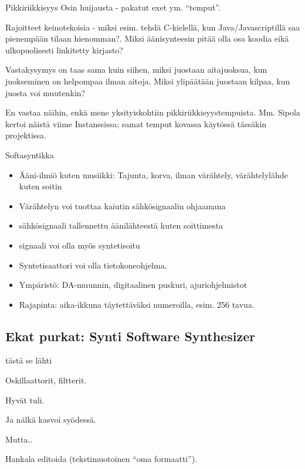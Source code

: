 \documentclass{beamer}
\begin{document}
\begin{frame}{Pikkiriikkisyys}
  Osin huijausta - pakatut exet ym. ``temput''.

  Rajoitteet keinotekoisia - miksi esim. tehdä C-kielellä, kun
  Java/Javascriptillä saa pienempään tilaan hienomman?. Miksi
  äänisynteesin pitää olla osa koodia eikä ulkopuolisesti linkitetty
  kirjasto?

  Vastakysymys on taas sama kuin siihen, miksi juostaan aitajuoksua,
  kun juokseminen on helpompaa ilman aitoja. Miksi ylipäätään juostaan
  kilpaa, kun juosta voi muutenkin?

  En vastaa näihin, enkä mene yksityiskohtiin
  pikkiriikkisyystempuista. Mm. Sipola kertoi näistä viime
  Instanssissa; samat temput kovassa käytössä tässäkin projektissa.

\end{frame}


\begin{frame}{Softasyntikka}
\begin{itemize}
  \item Ääni-ilmiö kuten musiikki: Tajunta, korva, ilman värähtely,
    värähtelylähde kuten soitin
  \item Värähtelyn voi tuottaa kaiutin sähkösignaalin ohjaamana
  \item sähkösignaali tallennettu äänilähteestä kuten soittimesta
  \item signaali voi olla myös syntetisoitu
  \item Syntetisaattori voi olla tietokoneohjelma.
  \item Ympäristö: DA-muunnin, digitaalinen puskuri, ajuriohjelmistot
  \item Rajapinta: aika-ikkuna täytettäväksi numeroilla, esim. 256
    tavua.
\end{itemize}
\end{frame}

\subsection{Ekat purkat: Synti Software Synthesizer}
\begin{frame}{tästä se lähti}

Oskillaattorit, filtterit.

Hyvät tuli.

Ja nälkä kasvoi syödessä.
\end{frame}

\begin{frame}{Mutta..}

  Hankala editoida (tekstimuotoinen ``oma formaatti'').

\end{frame}
\end{document}
